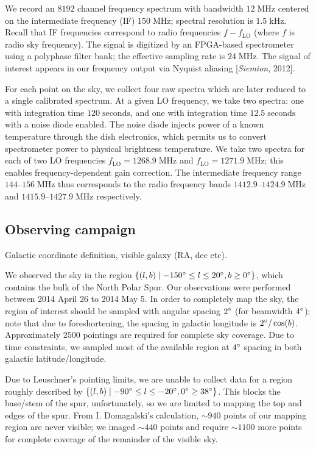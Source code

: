 \documentclass[10pt]{article}
\newcommand {\mt}{\mathrm}
\newcommand {\unit}[1]{\; \mt{#1}}
\begin{document}
We record an $8192$ channel frequency spectrum with bandwidth $12 \unit{MHz}$ centered on the intermediate frequency (IF) $150 \unit{MHz}$; spectral resolution is $1.5 \unit{kHz}$.  Recall that IF frequencies correspond to radio frequencies $f - f_{\mt{LO}}$ (where $f$ is radio sky frequency).  The signal is digitized by an FPGA-based spectrometer using a polyphase filter bank; the effective sampling rate is $24 \unit{MHz}$.  The signal of interest appears in our frequency output via Nyquist aliasing [\textit{Siemion}, 2012].

For each point on the sky, we collect four raw spectra which are later reduced to a single calibrated spectrum.  At a given LO frequency, we take two spectra: one with integration time $120 \unit{seconds}$, and one with integration time $12.5 \unit{seconds}$ with a noise diode enabled.  The noise diode injects power of a known temperature through the dish electronics, which permits us to convert spectrometer power to physical brightness temperature.  We take two spectra for each of two LO frequencies $f_{\mt{LO}} = 1268.9 \unit{MHz}$ and $f_{\mt{LO}} = 1271.9 \unit{MHz}$; this enables frequency-dependent gain correction.  The intermediate frequency range $144$--$156 \unit{MHz}$ thus corresponds to the radio frequency bands $1412.9$--$1424.9 \unit{MHz}$ and $1415.9$--$1427.9 \unit{MHz}$ respectively.

\subsection{Observing campaign}

Galactic coordinate definition, visible galaxy (RA, dec etc).

We observed the sky in the region $\{(l,b) \mid -150\degree \leq l \leq 20\degree, b \geq 0\degree\}$, which contains the bulk of the North Polar Spur.
Our observations were performed between 2014 April 26 to 2014 May 5.  In order to completely map the sky, the region of interest should be sampled with angular spacing $2\degree$ (for beamwidth $4\degree$); note that due to foreshortening, the spacing in galactic longitude is $2\degree / \cos(b)$.  Approximately $2500$ pointings are required for complete sky coverage.  Due to time constraints, we sampled most of the available region at $4\degree$ spacing in both galactic latitude/longitude.

Due to Leuschner's pointing limits, we are unable to collect data for a region roughly described by $\{(l,b) \mid -90 \degree \leq l \leq -20\degree, 0\degree \geq 38\degree\}$.  This blocks the base/stem of the spur, unfortunately, so we are limited to mapping the top and edges of the spur.  From I. Domagalski's calculation, $\sim940$ points of our mapping region are never visible; we imaged $\sim440$ points and require $\sim1100$ more points for complete coverage of the remainder of the visible sky.
\end{document}
